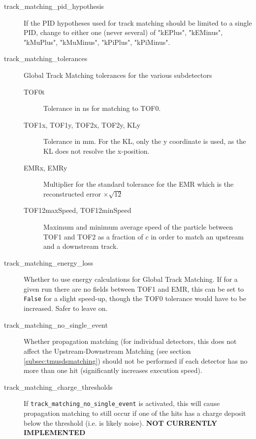 \begin{description}
  \item[track\_matching\_pid\_hypothesis] If the PID hypotheses used for track matching should be limited to a single PID,
      change to either one (never several) of "kEPlus", "kEMinus", "kMuPlus", "kMuMinus", "kPiPlus", "kPiMinus".
  \item[track\_matching\_tolerances] Global Track Matching tolerances for the various subdetectors
  \begin{description}
    \item[TOF0t] Tolerance in ns for matching to TOF0.
    \item[TOF1x, TOF1y, TOF2x, TOF2y, KLy] Tolerance in mm. For the KL, only the y coordinate is used, as the KL does not
        resolve the x-position.
    \item[EMRx, EMRy] Multiplier for the standard tolerance for the EMR which is the reconstructed error $\times \sqrt{12}$
    \item[TOF12maxSpeed, TOF12minSpeed] Maximum and minimum average speed of the particle between TOF1 and TOF2 as a fraction
        of $c$ in order to match an upstream and a downstream track.
  \end{description}
  \item[track\_matching\_energy\_loss] Whether to use energy calculations for Global Track Matching. If for a given run
      there are no fields between TOF1 and EMR, this can be set to \texttt{False} for a slight speed-up, though the TOF0
      tolerance would have to be increased. Safer to leave on.
  \item[track\_matching\_no\_single\_event] Whether propagation matching (for individual detectors, this does not affect the
      Upstream-Downstream Matching (see section \ref{subsec:tmusdsmatching}) should not be performed if each detector has no
      more than one hit (significantly increases execution speed).
  \item[track\_matching\_charge\_thresholds] If \texttt{track\_matching\_no\_single\_event} is activated, this will cause propagation
      matching to still occur if one of the hits has a charge deposit below the threshold (i.e. is likely noise). \textbf{NOT CURRENTLY IMPLEMENTED}
\end{description}
